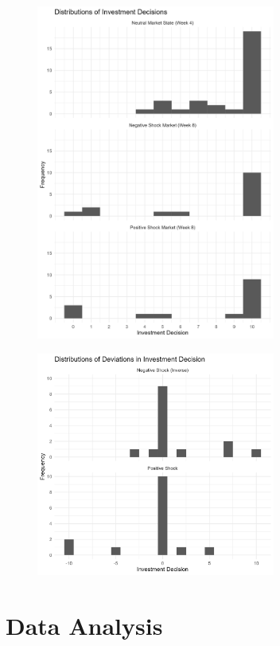 \documentclass[12pt, a4paper]{article}
\theoremstyle{remark}
\begin{document}
\begin{figure}[H]
	\centering
	\includegraphics[width=0.7\textwidth]{investment-decisions-distributions}
\end{figure}

\begin{figure}[H]
	\centering
	\includegraphics[width=0.7\textwidth]{investment-decision-deviations-distributions}
\end{figure}


\section{Data Analysis}
\end{document}
